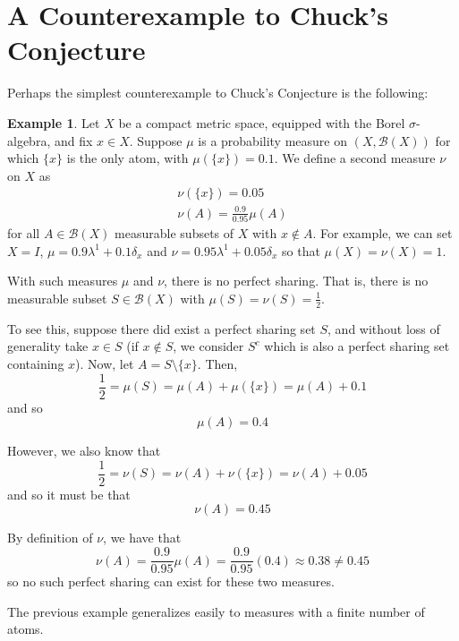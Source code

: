 \documentclass[12pt]{article}
\theoremstyle{definition}
\newtheorem{example}{Example}
\begin{document}
\section*{A Counterexample to Chuck's Conjecture}

Perhaps the simplest counterexample to Chuck's Conjecture is the following:

\begin{example}
    Let $X$ be a compact metric space, equipped with the Borel $\sigma$-algebra,
    and fix $x\in X$. Suppose $\mu$ is a probability measure on
    $(X,\mathscr{B}(X))$ for which $\{x\}$ is the only atom, with
    $\mu(\{x\})=0.1$. We define a second measure $\nu$ on $X$ as
    \[
        \begin{aligned}
            \nu(\{x\}) = 0.05\\
            \nu(A) = \frac{0.9}{0.95}\mu(A)
        \end{aligned}
    \]
    for all $A\in\mathscr{B}(X)$ measurable subsets of $X$ with $x\not\in A$.
    For example, we can set $X=I$, $\mu = 0.9\lambda^1 + 0.1\delta_x$ and $\nu =
    0.95\lambda^1 + 0.05\delta_x$ so that $\mu(X)=\nu(X)=1$. 

    With such measures $\mu$ and $\nu$, there is no perfect sharing. That is,
    there is no measurable subset $S\in\mathscr{B}(X)$ with
    $\mu(S)=\nu(S)=\frac{1}{2}$. 

    To see this, suppose there did exist a perfect sharing set $S$, and without
    loss of generality take $x\in S$ (if $x\not\in S$, we consider $S^c$ which
    is also a perfect sharing set containing $x$). Now, let $A=S\setminus\{x\}$.
    Then,
    \[
        \frac{1}{2} = \mu(S) = \mu(A) + \mu(\{x\}) = \mu(A) + 0.1
    \]
    and so
    \[
        \mu(A) = 0.4
    \]

    However, we also know that
    \[
        \frac{1}{2} = \nu(S) = \nu(A) + \nu(\{x\}) = \nu(A) + 0.05
    \]
    and so it must be that
    \[
        \nu(A) = 0.45
    \]

    By definition of $\nu$, we have that
    \[
        \nu(A) = \frac{0.9}{0.95}\mu(A) = \frac{0.9}{0.95}(0.4) \approx 0.38\neq
        0.45
    \]
    so no such perfect sharing can exist for these two measures.

\end{example}

The previous example generalizes easily to measures with a finite number of
atoms.
\end{document}
